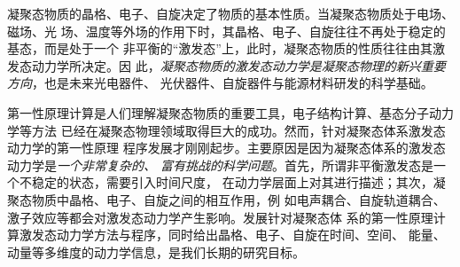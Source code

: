 


凝聚态物质的晶格、电子、自旋决定了物质的基本性质。当凝聚态物质处于电场、磁场、光
场、温度等外场的作用下时，其晶格、电子、自旋往往不再处于稳定的基态，而是处于一个
非平衡的“激发态”上，此时，凝聚态物质的性质往往由其激发态动力学所决定。因
此，\emph{凝聚态物质的激发态动力学是凝聚态物理的新兴重要方向}，也是未来光电器件、
光伏器件、自旋器件与能源材料研发的科学基础。

第一性原理计算是人们理解凝聚态物质的重要工具，电子结构计算、基态分子动力学等方法
已经在凝聚态物理领域取得巨大的成功。然而，针对凝聚态体系激发态动力学的第一性原理
程序发展才刚刚起步。主要原因是因为凝聚态体系的激发态动力学是\emph{一个非常复杂的、
  富有挑战的科学问题}。首先，所谓非平衡激发态是一个不稳定的状态，需要引入时间尺度，
在动力学层面上对其进行描述；其次，凝聚态物质中晶格、电子、自旋之间的相互作用，例
如电声耦合、自旋轨道耦合、激子效应等都会对激发态动力学产生影响。发展针对凝聚态体
系的第一性原理计算激发态动力学方法与程序，同时给出晶格、电子、自旋在时间、空间、
能量、动量等多维度的动力学信息，是我们长期的研究目标。

